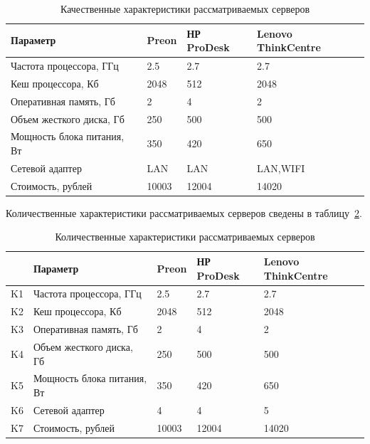 \documentclass[russian,utf8,emptystyle]{eskdtext}
\begin{document}
\begin{longtable}{p{7cm}|p{2cm}|p{2cm}|p{2cm}}
\caption{Качественные характеристики рассматриваемых серверов}
\label{tab:server-1} \\
Параметр                     & Preon      & НР ProDesk & Lenovo ThinkCentre \\ 
\hline 
Частота процессора, ГГц      & 2.5        & 2.7        & 2.7      \\ 
Кеш процессора, Кб           & 2048       & 512        & 2048     \\
Оперативная память, Гб       & 2          & 4          & 2        \\ 
Объем жесткого диска, Гб     & 250        & 500        & 500      \\ 
Мощность блока питания, Вт   & 350        & 420        & 650      \\ 
Сетевой адаптер              & LAN        & LAN        & LAN,WIFI \\ 
Стоимость, рублей            & 10003      & 12004      & 14020    \\
\end{longtable}

Количественные характеристики рассматриваемых серверов сведены в таблицу~\ref{tab:server-2}.

\begin{longtable}{p{1.5cm}|p{7cm}|p{2cm}|p{2cm}|p{2cm}}
\caption{Количественные характеристики рассматриваемых серверов}
\label{tab:server-2} \\
            & Параметр                     & Preon      & НР ProDesk & Lenovo ThinkCentre \\ 
\hline 
K1          & Частота процессора, ГГц      & 2.5        & 2.7        & 2.7      \\ 
K2          & Кеш процессора, Кб           & 2048       & 512        & 2048     \\
K3          & Оперативная память, Гб       & 2          & 4          & 2        \\ 
K4          & Объем жесткого диска, Гб     & 250        & 500        & 500      \\ 
K5          & Мощность блока питания, Вт   & 350        & 420        & 650      \\ 
K6          & Сетевой адаптер              & 4          & 4          & 5        \\ 
K7          & Стоимость, рублей            & 10003      & 12004      & 14020    \\
\end{longtable}
\end{document}
